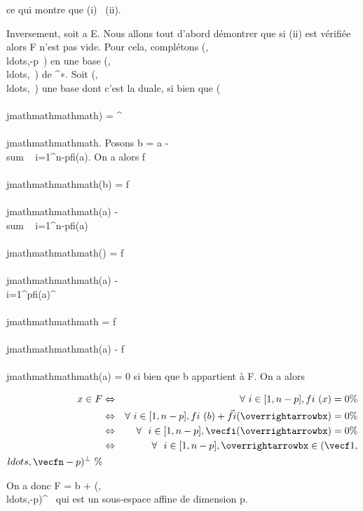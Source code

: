 ce qui montre que (i) \rigtharrow~(ii).

Inversement, soit a \in E. Nous allons tout d'abord démontrer que si (ii)
est vérifiée alors F n'est pas vide. Pour cela, complétons
(,\\ldots,\vecfn-p~)
en une base
(,\\ldots,\vecfn~)
de \overrightarrowE^∗. Soit
(,\\ldots,\vecen~)
une base dont c'est la duale, si bien que
\vecfi(\vece\\\\jmathmathmathmath)
= \deltai^\\\\jmathmathmathmath. Posons b = a
-\\sum ~
i=1^n-pfi(a)\vecei.
On a alors f\\\\jmathmathmathmath(b) = f\\\\jmathmathmathmath(a)
-\\sum ~
i=1^n-pfi(a)\vecf\\\\jmathmathmathmath(\vecei)
= f\\\\jmathmathmathmath(a) -\\\sum
 i=1^pfi(a)\deltai^\\\\jmathmathmathmath =
f\\\\jmathmathmathmath(a) - f\\\\jmathmathmathmath(a) = 0 si bien que b appartient à F. On a
alors

\begin{align*} x \in F& \Leftrightarrow
& \forall~i \in {[}1,n - p{]}, fi~(x) = 0
\%& \\ & \Leftrightarrow &
\forall~i \in {[}1,n - p{]}, fi~(b)
+\vec
fi(\overrightarrowbx) = 0 \%&
\\ & \Leftrightarrow &
\forall~~i \in {[}1,n - p{]},
\vecfi(\overrightarrowbx)
= 0 \%& \\ &
\Leftrightarrow & \forall~~i \in {[}1,n -
p{]}, \overrightarrowbx \in
(\vecf1,\\ldots,\vecfn-p)^\bot~\%&
\\ \end{align*}

On a donc F = b +
(,\\ldots,\vecfn-p)^\bot~
qui est un sous-espace affine de dimension p.

